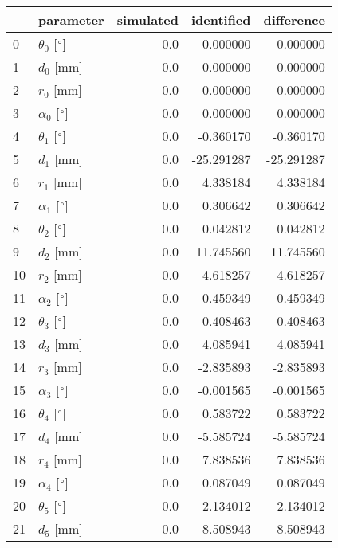 \documentclass{standalone}%
\begin{document}
%
\normalsize%
\begin{tabular}{llrrr}
\toprule
{} &                 parameter & simulated & identified & difference \\
\midrule
0  &  $\theta_{0}$ [$\degree$] &       0.0 &   0.000000 &   0.000000 \\
1  &              $d_{0}$ [mm] &       0.0 &   0.000000 &   0.000000 \\
2  &              $r_{0}$ [mm] &       0.0 &   0.000000 &   0.000000 \\
3  &  $\alpha_{0}$ [$\degree$] &       0.0 &   0.000000 &   0.000000 \\
4  &  $\theta_{1}$ [$\degree$] &       0.0 &  -0.360170 &  -0.360170 \\
5  &              $d_{1}$ [mm] &       0.0 & -25.291287 & -25.291287 \\
6  &              $r_{1}$ [mm] &       0.0 &   4.338184 &   4.338184 \\
7  &  $\alpha_{1}$ [$\degree$] &       0.0 &   0.306642 &   0.306642 \\
8  &  $\theta_{2}$ [$\degree$] &       0.0 &   0.042812 &   0.042812 \\
9  &              $d_{2}$ [mm] &       0.0 &  11.745560 &  11.745560 \\
10 &              $r_{2}$ [mm] &       0.0 &   4.618257 &   4.618257 \\
11 &  $\alpha_{2}$ [$\degree$] &       0.0 &   0.459349 &   0.459349 \\
12 &  $\theta_{3}$ [$\degree$] &       0.0 &   0.408463 &   0.408463 \\
13 &              $d_{3}$ [mm] &       0.0 &  -4.085941 &  -4.085941 \\
14 &              $r_{3}$ [mm] &       0.0 &  -2.835893 &  -2.835893 \\
15 &  $\alpha_{3}$ [$\degree$] &       0.0 &  -0.001565 &  -0.001565 \\
16 &  $\theta_{4}$ [$\degree$] &       0.0 &   0.583722 &   0.583722 \\
17 &              $d_{4}$ [mm] &       0.0 &  -5.585724 &  -5.585724 \\
18 &              $r_{4}$ [mm] &       0.0 &   7.838536 &   7.838536 \\
19 &  $\alpha_{4}$ [$\degree$] &       0.0 &   0.087049 &   0.087049 \\
20 &  $\theta_{5}$ [$\degree$] &       0.0 &   2.134012 &   2.134012 \\
21 &              $d_{5}$ [mm] &       0.0 &   8.508943 &   8.508943 \\

\end{tabular}
\end{document}
